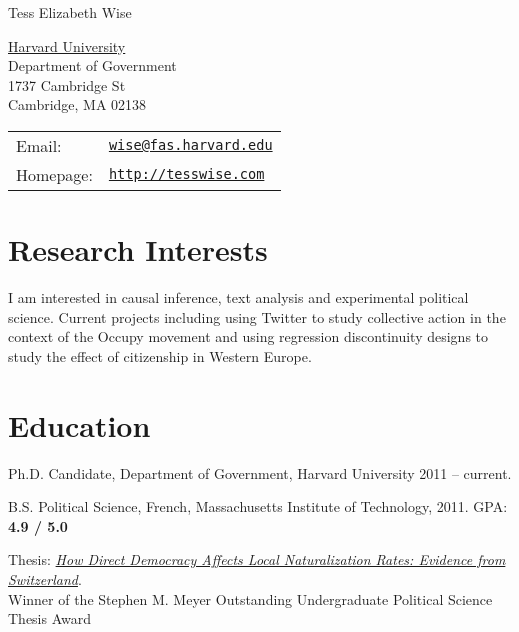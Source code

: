 \documentclass[letterpaper]{article}
\def\name{Tess Elizabeth Wise}
\renewenvironment{itemize}{
  \begin{list}{}{
    \setlength{\leftmargin}{1.5em}
  }
}{
  \end{list}
}
\begin{document}
{\huge \name}


\vspace{0.25in}

\begin{minipage}{0.45\linewidth}
  \href{http://www.gov.harvard.edu}{Harvard University} \\
  Department of Government \\
 1737 Cambridge St \\
 Cambridge, MA 02138\\
 
\end{minipage}
\begin{minipage}{0.45\linewidth}
  \begin{tabular}{ll}
    Email: & \href{mailto:wise@fas.harvard.edu}{\tt wise@fas.harvard.edu} \\
    Homepage: & \href{http://tesswise.com}{\tt http://tesswise.com} \\
  \end{tabular}
\end{minipage}

\section*{Research Interests}
\begin{itemize}
\item I am interested in causal inference, text analysis and experimental political science. Current projects including using Twitter to study collective action in the context of the Occupy movement and using regression discontinuity designs to study the effect of citizenship in Western Europe.
\end{itemize} 

\section*{Education}

\begin{itemize}
  \item Ph.D. Candidate, Department of Government, Harvard University 2011 -- current.
  \item B.S. Political Science, French, Massachusetts Institute of Technology, 2011.
  \subitem GPA: {\bf 4.9 / 5.0}
  
  \leftskip 0.5in
 \parindent -0.5in
  \subitem Thesis: \href{http://www.people.fas.harvard.edu/~wise/Undergrad\%20Thesis/}{\emph{How Direct Democracy Affects Local Naturalization Rates: Evidence from Switzerland}}. \\ Winner of the Stephen M. Meyer Outstanding Undergraduate Political Science Thesis Award
  
\end{itemize}
\end{document}
